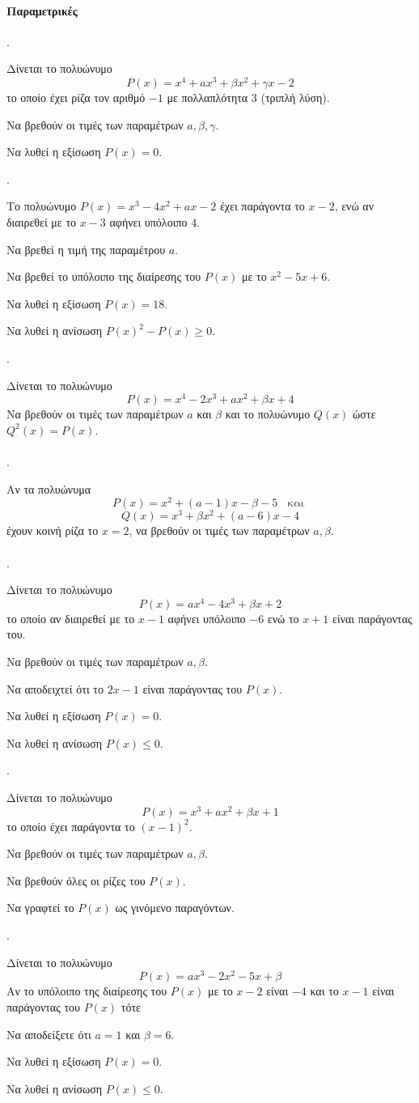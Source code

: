 \documentclass[11pt,a4paper,twocolumn]{article}
\newcounter{askhsh}
\newcommand{\askhsh}{\large\theaskhsh.\ \addtocounter{askhsh}{1}}
\begin{document}
\paragraph{Παραμετρικές}
\askhsh Δίνεται το πολυώνυμο \[ P(x)=x^4+ax^3+\beta x^2+\gamma x-2 \] το οποίο έχει ρίζα τον αριθμό $ -1 $ με πολλαπλότητα 3 (τριπλή λύση).
\begin{alist}
\item Να βρεθούν οι τιμές των παραμέτρων $ a,\beta,\gamma $.
\item Να λυθεί η εξίσωση $ P(x)=0 $.
\end{alist}
\askhsh Το πολυώνυμο $ P(x)=x^3-4x^2+ax-2 $ έχει παράγοντα το $ x-2 $, ενώ αν διαιρεθεί με το $ x-3 $ αφήνει υπόλοιπο $ 4 $.
\begin{alist}
\item Να βρεθεί η τιμή της παραμέτρου $ a $.
\item Να βρεθεί το υπόλοιπο της διαίρεσης του $ P(x) $ με το $ x^2-5x+6 $.
\item Να λυθεί η εξίσωση $ P(x)=18 $.
\item Να λυθεί η ανίσωση $ P(x)^2-P(x)\geq 0 $.
\end{alist}
\askhsh Δίνεται το πολυώνυμο \[ P(x)=x^4-2x^3+ax^2+\beta x+4 \] Να βρεθούν οι τιμές των παραμέτρων $ a $ και $ \beta $ και το πολυώνυμο $ Q(x) $ ώστε $ Q^2(x)=P(x) $.\\\\
\askhsh Αν τα πολυώνυμα \[ P(x)=x^2+(a-1)x-\beta-5
\;\;\textrm{ και }\]
\[Q(x) = x^3+\beta x^2+(a-6)x-4 \] έχουν κοινή ρίζα το $ x=2 $, να βρεθούν οι τιμές των παραμέτρων $ a,\beta $.\\\\
\askhsh Δίνεται το πολυώνυμο \[ P(x)=ax^4-4x^3+\beta x+2 \] το οποίο αν διαιρεθεί με το $ x-1 $ αφήνει υπόλοιπο $ -6 $ ενώ το $ x+1 $ είναι παράγοντας του.
\begin{alist}
\item Να βρεθούν οι τιμές των παραμέτρων $ a,\beta $.
\item Να αποδειχτεί ότι το $ 2x-1 $ είναι παράγοντας του $ P(x) $.
\item Να λυθεί η εξίσωση $ P(x)=0 $.
\item Να λυθεί η ανίσωση $ P(x)\leq0 $.
\end{alist}
\askhsh Δίνεται το πολυώνυμο \[ P(x)=x^3+ax^2+\beta x+1 \] το οποίο έχει παράγοντα το $ \left(x-1\right)^2 $.
\begin{alist}
\item Να βρεθούν οι τιμές των παραμέτρων $ a,\beta $.
\item Να βρεθούν όλες οι ρίζες του $ P(x) $.
\item Να γραφτεί το $P(x)$ ως γινόμενο παραγόντων.
\end{alist}
\askhsh Δίνεται το πολυώνυμο \[ P(x)=ax^3-2x^2-5x+\beta \] 
Αν το υπόλοιπο της διαίρεσης του $ P(x) $ με το $ x-2 $ είναι $ -4 $ και το $ x-1 $ είναι παράγοντας του $ P(x) $ τότε
\begin{alist}
\item Να αποδείξετε ότι $ a=1 $ και $ \beta=6 $.
\item Να λυθεί η εξίσωση $ P(x)=0 $.
\item Να λυθεί η ανίσωση $ P(x)\leq0 $.
\end{alist}
\end{document}
